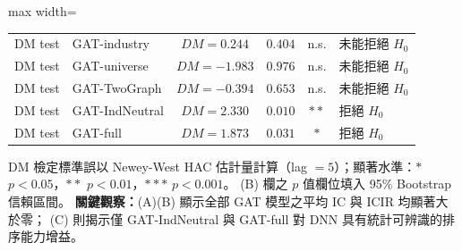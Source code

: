 \begin{table}[H]
\begin{adjustbox}{max width=\textwidth}
\begin{tabular}{@{}llcccl@{}}
DM test & GAT-industry    & $DM =  0.244$ & $0.404$ & n.s. & 未能拒絕 $H_0$ \\
DM test & GAT-universe    & $DM = -1.983$ & $0.976$ & n.s. & 未能拒絕 $H_0$ \\
DM test & GAT-TwoGraph    & $DM = -0.394$ & $0.653$ & n.s. & 未能拒絕 $H_0$ \\
DM test & GAT-IndNeutral  & $DM =  2.330$ & $0.010$ & $**$ & 拒絕 $H_0$ \\
DM test & GAT-full        & $DM =  1.873$ & $0.031$ & $*$  & 拒絕 $H_0$ \\
\bottomrule
\end{tabular}
\end{adjustbox}
\smallskip

{\footnotesize
  DM 檢定標準誤以 Newey-West HAC 估計量計算（lag $= 5$）；顯著水準：$*$ $p < 0.05$，$**$ $p < 0.01$，$***$ $p < 0.001$。
  (B) 欄之 $p$ 值欄位填入 95\% Bootstrap 信賴區間。
  \textbf{關鍵觀察：}(A)(B) 顯示全部 GAT 模型之平均 IC 與 ICIR 均顯著大於零；
  (C) 則揭示僅 GAT-IndNeutral 與 GAT-full 對 DNN 具有統計可辨識的排序能力增益。
}
\endgroup
\end{table}
